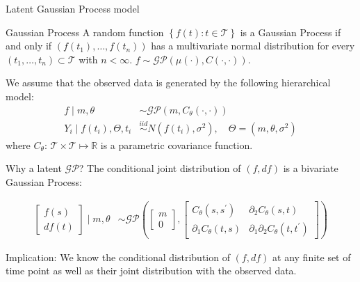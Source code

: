 \documentclass[ignorenonframetext,xcolor=pdflatex,table,dvipsnames,serif]{beamer}
\begin{document}
\begin{frame}{Latent Gaussian Process model}
\begin{alertblock}{Gaussian Process}
A random function $\left\{f(t) : t \in \mathcal{T}\right\}$ is a Gaussian Process if and only if $(f(t_1), \ldots, f(t_n))$ has a multivariate normal distribution for every $(t_1, \ldots, t_n) \subset \mathcal{T}$ with $n < \infty$. $f \sim \mathcal{GP}(\mu(\cdot), C(\cdot, \cdot))$.
\end{alertblock}

\pause

\vspace{1cm}

We assume that the observed data is generated by the following hierarchical model:
\begin{align*}
  f \mid m, \theta &\sim \mathcal{GP}(m, C_\theta(\cdot,\cdot))\\
  Y_i \mid f(t_i), \Theta, t_i &\overset{iid}{\sim} N(f(t_i), \sigma^2), \quad \Theta = (m, \theta, \sigma^2)
\end{align*}
where $C_\theta\colon\, \mathcal{T} \times \mathcal{T} \mapsto \mathbb{R}$ is a parametric covariance function.
\end{frame}


\begin{frame}{Why a latent $\mathcal{GP}$?}
The conditional joint distribution of $(f, df)$ is a bivariate Gaussian Process:

\vspace{0.8cm}

\begin{align*}
  \begin{bmatrix}f(s)\\ df(t) \end{bmatrix} \mid m, \theta &\sim \mathcal{GP}\left(\begin{bmatrix}m\\ 0\end{bmatrix}, \begin{bmatrix}C_\theta(s, s^\prime) & \partial_2 C_\theta(s, t)\\ \partial_1 C_\theta(t, s) & \partial_1 \partial_2 C_\theta(t, t^\prime)\end{bmatrix}\right)
\end{align*}

\vspace{0.8cm}

Implication: We know the conditional distribution of $(f, df)$ at \alert{any} finite set of time point as well as their joint distribution with the observed data.

\end{frame}
\end{document}
